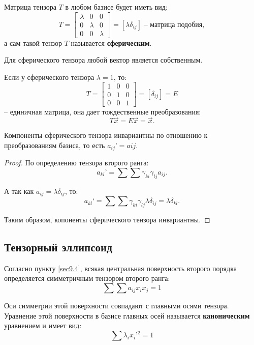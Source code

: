 	\begin{theorem}
	Матрица тензора \( T \) в любом базисе будет иметь вид:
	\[ T = \begin{bmatrix}
	\lambda & 0 & 0 \\
	0 & \lambda & 0 \\
	0 & 0 & \lambda
	\end{bmatrix} = [\lambda\delta_{ij}] \text{ -- матрица подобия}, \]
	а сам такой тензор \( T \) называется \textbf{сферическим}.
	\end{theorem}
	
	Для сферического тензора любой вектор является собственным.
	
	Если у сферического тензора \( \lambda = 1 \), то:
	\[ T = \begin{bmatrix}
	1 & 0 & 0 \\
	0 & 1 & 0 \\
	0 & 0 & 1
	\end{bmatrix} = [\delta_{ij}] = E \]
	-- единичная матрица, она дает тождественные преобразования:
	\[ T\vec{x} = E\vec{x} = \vec{x}. \]
	
	\begin{theorem}
	Компоненты сферического тензора инвариантны по отношению к преобразованиям базиса, то есть \( a_{ij}{’} = a{ij} \).
	\end{theorem}
	
	\begin{proof}
	
	По определению тензора второго ранга:
	\[ a_{kl}{’} = \sum\sum \gamma_{ki}\gamma_{lj}a_{ij}. \]
	
	А так как \( a_{ij} = \lambda\delta_{ij} \), то:
	\[ a_{kl}{‘} = \sum\sum \gamma_{ki}\gamma_{lj}\lambda\delta_{ij} = \lambda\delta_{kl}. \]
	
	Таким образом, копоненты сферического тензора инвариантны.
	\end{proof}

\subsection{Тензорный эллипсоид}

	Согласно пункту \ref{sec9.4}, всякая центральная поверхность второго порядка определяется симметричным тензором второго ранга:
	\[ \sum\sum a_{ij} x_i x_j = 1 \]
	
	Оси симметрии этой поверхности совпадают с главными осями тензора. Уравнение этой поверхности в базисе главных осей называется \textbf{каноническим} уравнением и имеет вид:
	\[ \sum \lambda_ix_i{’}^2 = 1 \]
	
